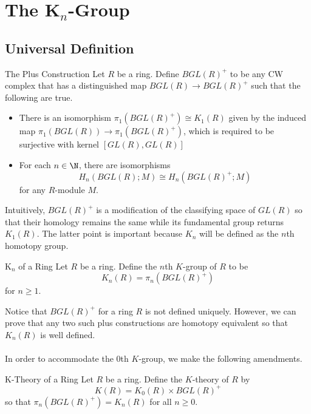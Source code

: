 \documentclass[a4paper]{article}
\begin{document}
\pagebreak
\section{The K${_n}$-Group}
\subsection{Universal Definition}
\begin{defn}{The Plus Construction}{} Let $R$ be a ring. Define $BGL(R)^+$ to be any CW complex that has a distinguished map $BGL(R)\to BGL(R)^+$ such that the following are true. 
\begin{itemize}
\item There is an isomorphism $\pi_1(BGL(R)^+)\cong K_1(R)$ given by the induced map $\pi_1(BGL(R))\to\pi_1(BGL(R)^+)$, which is required to be surjective with kernel $[GL(R),GL(R)]$
\item For each $n\in\N$, there are isomorphisms $$H_n(BGL(R);M)\cong H_n(BGL(R)^+;M)$$ for any $R$-module $M$. 
\end{itemize}
\end{defn}

Intuitively, $BGL(R)^+$ is a modification of the classifying space of $GL(R)$ so that their homology remains the same while its fundamental group returns $K_1(R)$. The latter point is important because $K_n$ will be defined as the $n$th homotopy group. 

\begin{defn}{K${_n}$ of a Ring}{} Let $R$ be a ring. Define the $n$th $K$-group of $R$ to be $$K_n(R)=\pi_n(BGL(R)^+)$$ for $n\geq 1$. 
\end{defn}

Notice that $BGL(R)^+$ for a ring $R$ is not defined uniquely. However, we can prove that any two such plus constructions are homotopy equivalent so that $K_n(R)$ is well defined. \\~\\

In order to accommodate the $0$th $K$-group, we make the following amendments. 

\begin{defn}{K-Theory of a Ring}{} Let $R$ be a ring. Define the $K$-theory of $R$ by $$K(R)=K_0(R)\times BGL(R)^+$$ so that $\pi_n(BGL(R)^+)=K_n(R)$ for all $n\geq 0$. 
\end{defn}

\section{}
\end{document}
